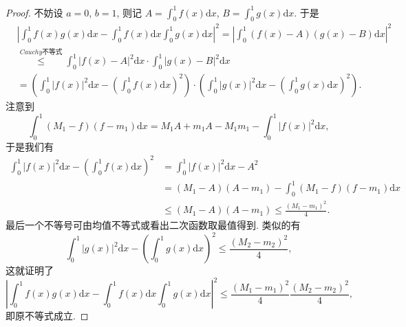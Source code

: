 \documentclass[../../main.tex]{subfiles}
\begin{document}
\begin{proof}
不妨设 $a = 0$, $b = 1$, 则记 $A = \int_{0}^{1}f(x)\mathrm{d}x$, $B = \int_{0}^{1}g(x)\mathrm{d}x$. 于是
\begin{align*}
&\left|\int_{0}^{1}f(x)g(x)\mathrm{d}x - \int_{0}^{1}f(x)\mathrm{d}x\int_{0}^{1}g(x)\mathrm{d}x\right|^2 = \left|\int_{0}^{1}(f(x) - A)(g(x) - B)\mathrm{d}x\right|^2
\\
&\stackrel{\hyperref[theorem:Cauchy不等式(一般版本)]{Cauchy\text{不等式}}}{\leq} \int_{0}^{1}|f(x) - A|^2\mathrm{d}x \cdot \int_{0}^{1}|g(x) - B|^2\mathrm{d}x
\\
&= \left(\int_{0}^{1}|f(x)|^2\mathrm{d}x - \left(\int_{0}^{1}f(x)\mathrm{d}x\right)^2\right) \cdot \left(\int_{0}^{1}|g(x)|^2\mathrm{d}x - \left(\int_{0}^{1}g(x)\mathrm{d}x\right)^2\right).
\end{align*}
注意到
\[
\int_{0}^{1}(M_1 - f)(f - m_1)\mathrm{d}x = M_1A + m_1A - M_1m_1 - \int_{0}^{1}|f(x)|^2\mathrm{d}x,
\]
于是我们有
\begin{align*}
\int_{0}^{1}|f(x)|^2\mathrm{d}x - \left(\int_{0}^{1}f(x)\mathrm{d}x\right)^2 &=\int_{0}^{1}|f(x)|^2\mathrm{d}x -A^2
\\
&= (M_1 - A)(A - m_1) - \int_{0}^{1}(M_1 - f)(f - m_1)\mathrm{d}x\\
&\leq (M_1-A)(A-m_1)\leq \frac{(M_1-m_1)^2}{4}.
\end{align*}
最后一个不等号可由均值不等式或看出二次函数取最值得到.
类似的有
\[
\int_{0}^{1}|g(x)|^2\mathrm{d}x - \left(\int_{0}^{1}g(x)\mathrm{d}x\right)^2 \leq \frac{(M_2 - m_2)^2}{4},
\]
这就证明了
\[
\left|\int_{0}^{1}f(x)g(x)\mathrm{d}x - \int_{0}^{1}f(x)\mathrm{d}x\int_{0}^{1}g(x)\mathrm{d}x\right|^2 \leq \frac{(M_1 - m_1)^2}{4}\frac{(M_2 - m_2)^2}{4},
\]
即原不等式成立. 
\end{proof}
\end{document}
